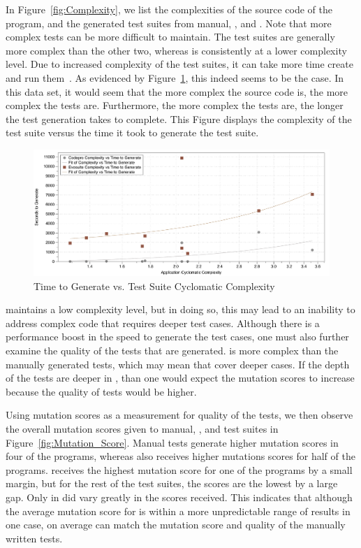 In Figure~\ref{fig:Complexity}, we list the complexities of the source code of the program, and the generated test suites from manual, \evo, and \codepro. Note that more complex tests can be more difficult to maintain. The \evo test suites are generally more complex than the other two, whereas \codepro is consistently at a lower complexity level. Due to increased complexity of the test suites, it can take more time create and run them~\cite{alspaugh:2007}. As evidenced by Figure~\ref{fig:Time_Complexity}, this indeed seems to be the case. In this data set, it would seem that the more complex the source code is, the more complex the tests are. Furthermore, the more complex the tests are, the longer the test generation takes to complete. This Figure displays the complexity of the test suite versus the time it took to generate the test suite. 

\begin{figure}[!t]
\centering
  \includegraphics[width=\textwidth]{Time_Complexity}
    \caption{Time to Generate vs. Test Suite Cyclomatic Complexity}
  \label{fig:Time_Complexity}
\end{figure}


\codepro maintains a low complexity level, but in doing so, this may lead to an inability to address complex code that requires deeper test cases. Although there is a performance boost in the speed to generate the test cases, one must also further examine the quality of the tests that are generated. \evo is more complex than the manually generated tests, which may mean that \evo cover deeper cases. If the depth of the tests are deeper in \evo, than one would expect the mutation scores to increase because the quality of tests would be higher. 

Using mutation scores as a measurement for quality of the tests, we then observe the overall mutation scores given to manual, \evo, and \codepro test suites in Figure~\ref{fig:Mutation_Score}. Manual tests generate higher mutation scores in four of the programs, whereas \evo also receives higher mutations scores for half of the programs. \codepro receives the highest mutation score for one of the programs by a small margin, but for the rest of the test suites, the scores are the lowest by a large gap. Only in \diebierse did \evo vary greatly in the scores received. This indicates that although the average mutation score for \evo is within a more unpredictable range of results in one case, on average \evo can match the mutation score and quality of the manually written tests.

